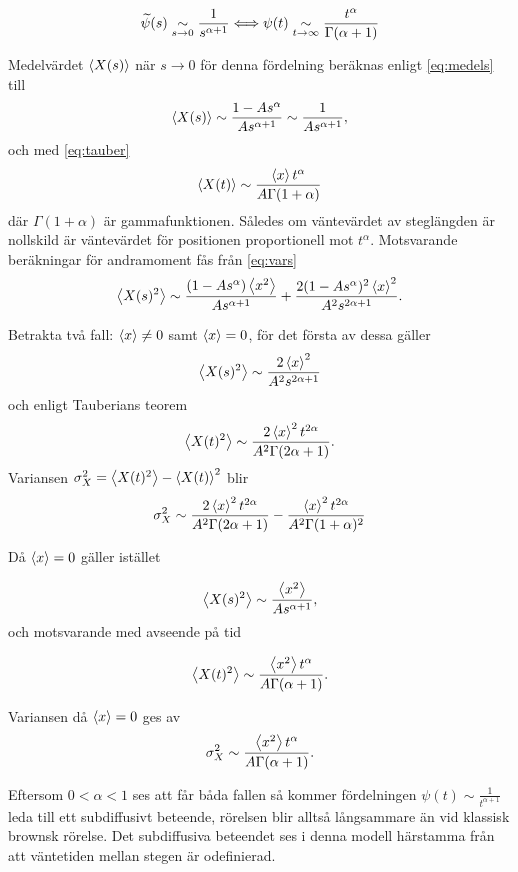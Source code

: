 \begin{equation}\label{eq:tauber}
   \widetilde{\psi} (s)\underset{s\to 0}{\sim}\frac{1}{s^{\alpha+1}}\Longleftrightarrow \psi(t)\underset{t\to\infty}{\sim}\frac{t^{\alpha}}{\Gamma (\alpha+1)}
\end{equation}

Medelvärdet $\ev{X(s)}$ när $s\to 0$ för denna fördelning beräknas enligt \eqref{eq:medels} till
\begin{equation}
    \ev{X(s)} \sim \frac{1-As^{\alpha}}{As^{\alpha+1}} \sim \frac{1}{As^{\alpha+1}},
\end{equation}
och med \eqref{eq:tauber}
\begin{equation}
    \ev{X(t)} \sim \frac{\ev{x}t^{\alpha}}{A\Gamma (1+\alpha)}
\end{equation}
där $\Gamma (1+\alpha)$ är gammafunktionen. Således om väntevärdet av steglängden är nollskild är väntevärdet för positionen proportionell mot $t^{\alpha}$. Motsvarande beräkningar för andramoment fås från \eqref{eq:vars}
\begin{equation}
   \ev{X(s)^2} \sim \frac{(1-As^{\alpha})\ev{x^2}}{As^{\alpha+1}}+\frac{2(1-As^{\alpha})^2\ev{x}^2}{A^2s^{2\alpha+1}}.
\end{equation}

Betrakta två fall: $\ev{x}\neq0$ samt $\ev{x}=0$, för det första av dessa gäller 
\begin{equation}
   \ev{X(s)^2} \sim \frac{2\ev{x}^2}{A^2s^{2\alpha+1}}
\end{equation}
och enligt Tauberians teorem 
\begin{equation}
   \ev{X(t)^2} \sim \frac{2\ev{x}^2t^{2\alpha}}{A^2\Gamma (2\alpha+1)}.
\end{equation}
Variansen $\sigma_X^2 = \ev{X(t)^2}-\ev{X(t)}^2$ blir 
\begin{equation}
    \sigma_X^2 \sim \frac{2\ev{x}^2t^{2\alpha}}{A^2\Gamma (2\alpha+1)}-\frac{\ev{x}^2t^{2\alpha}}{A^2\Gamma (1+\alpha)^2}
\end{equation}


Då $\ev{x}=0$ gäller istället 

\begin{equation}
   \ev{X(s)^2}\sim \frac{\ev{x^2}}{As^{\alpha+1}},
\end{equation}
och motsvarande med avseende på tid 

\begin{equation}
   \ev{X(t)^2} \sim \frac{\ev{x^2}t^{\alpha}}{A\Gamma (\alpha+1)}.
\end{equation}

Variansen då $\ev{x}=0$ ges av 
\begin{equation}
   \sigma_X^2 \sim \frac{\ev{x^2}t^{\alpha}}{A\Gamma (\alpha+1)}.
\end{equation}

Eftersom $0<\alpha<1$ ses att får båda fallen så kommer fördelningen $\psi(t)\sim \frac{1}{t^{\alpha+1}}$ leda till ett subdiffusivt beteende, rörelsen blir alltså långsammare än vid klassisk brownsk rörelse. Det subdiffusiva beteendet ses i denna modell härstamma från att väntetiden mellan stegen är odefinierad. 


